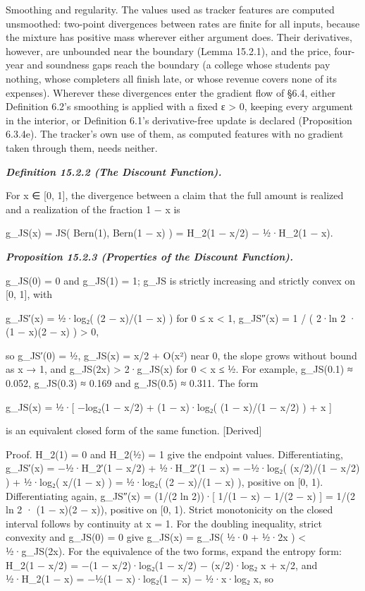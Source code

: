 \documentclass[
]{article}
\begin{document}
Smoothing and regularity. The values used as tracker features are
computed unsmoothed: two-point divergences between rates are finite for
all inputs, because the mixture has positive mass wherever either
argument does. Their derivatives, however, are unbounded near the
boundary (Lemma 15.2.1), and the price, four-year and soundness gaps
reach the boundary (a college whose students pay nothing, whose
completers all finish late, or whose revenue covers none of its
expenses). Wherever these divergences enter the gradient flow of §6.4,
either Definition 6.2's smoothing is applied with a fixed ε
\textgreater{} 0, keeping every argument in the interior, or Definition
6.1's derivative-free update is declared (Proposition 6.3.4e). The
tracker's own use of them, as computed features with no gradient taken
through them, needs neither.

\emph{\textbf{Definition 15.2.2 (The Discount Function).}}

For x ∈ {[}0, 1{]}, the divergence between a claim that the full amount
is realized and a realization of the fraction 1 − x is

g\_JS(x) = JS( Bern(1), Bern(1 − x) ) = H\_2(1 − x/2) − ½·H\_2(1 − x).

\emph{\textbf{Proposition 15.2.3 (Properties of the Discount
Function).}}

g\_JS(0) = 0 and g\_JS(1) = 1; g\_JS is strictly increasing and strictly
convex on {[}0, 1{]}, with

g\_JS′(x) = ½·log₂( (2 − x)/(1 − x) ) for 0 ≤ x \textless{} 1, g\_JS″(x)
= 1 / ( 2·ln 2 · (1 − x)(2 − x) ) \textgreater{} 0,

so g\_JS′(0) = ½, g\_JS(x) = x/2 + O(x²) near 0, the slope grows without
bound as x → 1, and g\_JS(2x) \textgreater{} 2·g\_JS(x) for 0
\textless{} x ≤ ½. For example, g\_JS(0.1) ≈ 0.052, g\_JS(0.3) ≈ 0.169
and g\_JS(0.5) ≈ 0.311. The form

g\_JS(x) = ½·{[} −log₂(1 − x/2) + (1 − x)·log₂( (1 − x)/(1 − x/2) ) + x
{]}

is an equivalent closed form of the same function. {[}Derived{]}

Proof. H\_2(1) = 0 and H\_2(½) = 1 give the endpoint values.
Differentiating, g\_JS′(x) = −½·H\_2′(1 − x/2) + ½·H\_2′(1 − x) =
−½·log₂( (x/2)/(1 − x/2) ) + ½·log₂( x/(1 − x) ) = ½·log₂( (2 − x)/(1 −
x) ), positive on {[}0, 1). Differentiating again, g\_JS″(x) = (1/(2 ln
2))·{[} 1/(1 − x) − 1/(2 − x) {]} = 1/(2 ln 2 · (1 − x)(2 − x)),
positive on {[}0, 1). Strict monotonicity on the closed interval follows
by continuity at x = 1. For the doubling inequality, strict convexity
and g\_JS(0) = 0 give g\_JS(x) = g\_JS( ½·0 + ½·2x ) \textless{}
½·g\_JS(2x). For the equivalence of the two forms, expand the entropy
form: H\_2(1 − x/2) = −(1 − x/2)·log₂(1 − x/2) − (x/2)·log₂ x + x/2, and
½·H\_2(1 − x) = −½(1 − x)·log₂(1 − x) − ½·x·log₂ x, so
\end{document}
